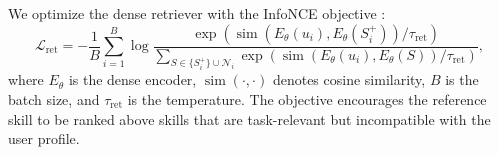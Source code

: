 \documentclass[letterpaper]{article} %
\begin{document}
We optimize the dense retriever with the InfoNCE objective \cite{oord2019representationlearningcontrastivepredictive}:
\begin{equation}
\mathcal{L}_{\mathrm{ret}}
=
-\frac{1}{B}
\sum_{i=1}^{B}
\log
\frac{
\exp\!\left(
\operatorname{sim}
\left(
E_{\theta}(u_i),
E_{\theta}(S_i^{+})
\right)/\tau_{\mathrm{ret}}
\right)
}{
\sum\limits_{S\in\{S_i^{+}\}\cup\mathcal{N}_i}
\exp\!\left(
\operatorname{sim}
\left(
E_{\theta}(u_i),
E_{\theta}(S)
\right)/\tau_{\mathrm{ret}}
\right)
},
\label{eq:app_retriever_loss}
\end{equation}
where $E_{\theta}$ is the dense encoder,
$\operatorname{sim}(\cdot,\cdot)$ denotes cosine similarity,
$B$ is the batch size, and $\tau_{\mathrm{ret}}$ is the temperature.
The objective encourages the reference skill to be ranked above skills that
are task-relevant but incompatible with the user profile.




\end{document}
